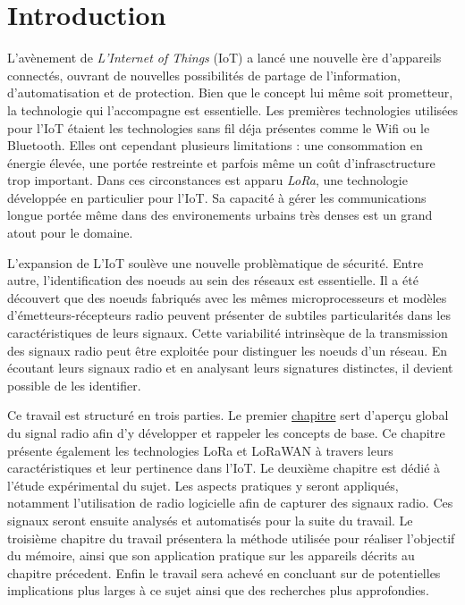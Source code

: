 

\chapter*{Introduction}

\renewcommand{\leftmark}{INTRODUCTION}

L'avènement de \textit{L'Internet of Things} (IoT) a lancé une nouvelle ère d'appareils connectés, ouvrant de nouvelles possibilités de partage de l'information, d'automatisation et de protection. Bien que le concept lui même soit prometteur, la technologie qui l'accompagne est essentielle.
Les premières technologies utilisées pour l'IoT étaient les technologies sans fil déja présentes comme le Wifi ou le Bluetooth. Elles ont cependant plusieurs limitations : une consommation en énergie élevée, une portée restreinte et parfois même un coût d'infrasctructure trop important.
Dans ces circonstances est apparu \textit{LoRa}, une technologie développée en particulier pour l'IoT. Sa capacité à gérer les communications longue portée même dans des environements urbains très denses est un grand atout pour le domaine.

\vspace{0.1cm}

L'expansion de L'IoT soulève une nouvelle problèmatique de sécurité. Entre autre, l'identification des noeuds au sein des réseaux est essentielle. Il a été découvert que des noeuds fabriqués avec les mêmes microprocesseurs et modèles d'émetteurs-récepteurs radio peuvent présenter de subtiles particularités dans les caractéristiques de leurs signaux. Cette variabilité intrinsèque de la transmission des signaux radio peut être exploitée pour distinguer les noeuds d’un réseau. En écoutant leurs signaux radio et en analysant leurs signatures distinctes, il devient possible de les identifier.

\vspace{0.1cm}

Ce travail est structuré en trois parties. Le premier          \hyperref[chap1]{chapitre} sert d'aperçu global du signal radio afin d'y développer et rappeler les concepts de base. Ce chapitre présente également les technologies LoRa et LoRaWAN à travers leurs caractéristiques et leur pertinence dans l'IoT.
Le deuxième chapitre est dédié à l'étude expérimental du sujet. Les aspects pratiques y seront appliqués, notamment l'utilisation de radio logicielle afin de capturer des signaux radio. Ces signaux seront ensuite analysés et automatisés pour la suite du travail.
Le troisième chapitre du travail présentera la méthode utilisée pour réaliser l'objectif du mémoire, ainsi que son application pratique sur les appareils décrits au chapitre précedent. Enfin le travail sera achevé en concluant sur de potentielles implications plus larges à ce sujet ainsi que des recherches plus approfondies.

